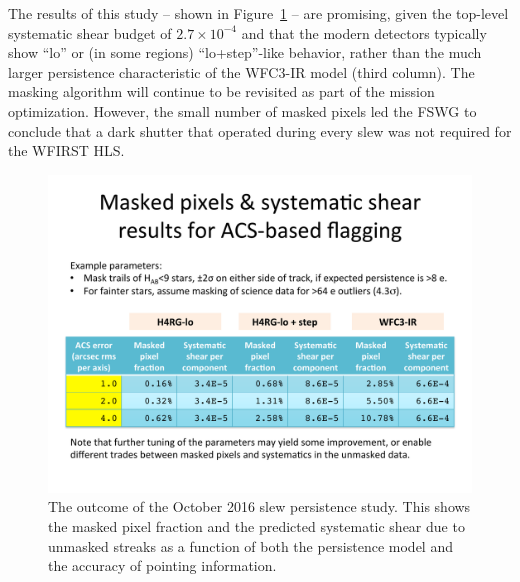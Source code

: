 The results of this study -- shown in Figure~\ref{fig:slew_results_oct16} -- are promising, given the top-level systematic shear budget of $2.7\times 10^{-4}$ and that the modern detectors typically show ``lo'' or (in some regions) ``lo+step''-like behavior, rather than the much larger persistence characteristic of the WFC3-IR model (third column). The masking algorithm will continue to be revisited as part of the mission optimization. However, the small number of masked pixels led the FSWG to conclude that a dark shutter that operated during every slew was not required for the WFIRST HLS.

\begin{figure}
\includegraphics[width=5in]{Plots/slew_results_oct16.pdf}
\caption{\label{fig:slew_results_oct16}The outcome of the October 2016 slew persistence study. This shows the masked pixel fraction and the predicted systematic shear due to unmasked streaks as a function of both the persistence model and the accuracy of pointing information.}
\end{figure}

